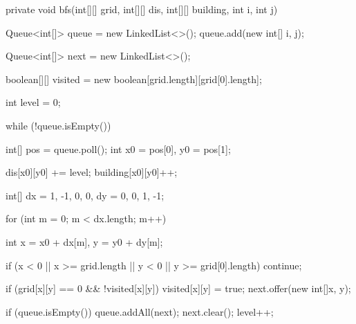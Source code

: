 \newpage

\begin{Code}
private void bfs(int[][] grid, int[][] dis, int[][] building, int i, int j) {
    Queue<int[]> queue = new LinkedList<>();
    queue.add(new int[] {i, j});

    Queue<int[]> next = new LinkedList<>();

    boolean[][] visited = new boolean[grid.length][grid[0].length];

    int level = 0;

    while (!queue.isEmpty()) {
        int[] pos = queue.poll();
        int x0 = pos[0], y0 = pos[1];

        dis[x0][y0] += level;
        building[x0][y0]++;

        int[] dx = {1, -1, 0, 0}, dy = {0, 0, 1, -1};

        for (int m = 0; m < dx.length; m++) {
            int x = x0 + dx[m], y = y0 + dy[m];

            if (x < 0 || x >= grid.length || y < 0 || y >= grid[0].length) {
                continue;
            }

            if (grid[x][y] == 0 && !visited[x][y]) {
                visited[x][y] = true;
                next.offer(new int[]{x, y});
            }
        }

        if (queue.isEmpty()) {
            queue.addAll(next);
            next.clear();
            level++;
        }
    }
}
\end{Code}